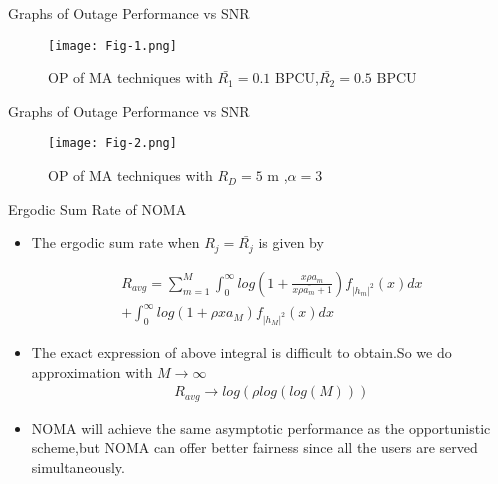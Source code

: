 \documentclass{beamer}
\providecommand{\brak}[1]{\ensuremath{\left(#1\right)}}
\providecommand{\abs}[1]{\vert#1\vert}
\begin{document}
        \begin{frame}{Graphs of Outage Performance vs SNR}
       
            \begin{figure}[ht]
    \centering
    \texttt{[image: Fig-1.png]}
    \caption{OP of MA techniques with $\bar{R_1}=0.1$ BPCU,$\bar{R_2}=0.5$ BPCU}
    \label{OP vs SNR 1}
\end{figure}
        \end{frame}
               \begin{frame}{Graphs of Outage Performance vs SNR}
       
            \begin{figure}[ht]
    \centering
    \texttt{[image: Fig-2.png]}
    \caption{OP of MA techniques with $R_D=5$ m ,$\alpha=3$ }
    \label{OP vs SNR 2}
\end{figure}
        \end{frame}
        \begin{frame}{}
            \begin{block}{Ergodic Sum Rate of NOMA}
            \begin{itemize}
                \item The ergodic sum rate when $R_j=\bar{R_j}$ is given by
                
                    \begin{equation}
                   \begin{split} R_{avg}=\sum_{m=1}^{M} \int_{0} ^{\infty} log\brak{1+\frac{x \rho a_m}{x\rho \bar{a_m}+1}} f_{\abs{h_m}^2} (x) dx\\
                    +\int_{0} ^{\infty} log(1+\rho x a_M) f_{\abs{h_M}^2} (x) dx
                    \end{split}
                    \end{equation}
        \item The exact expression of above integral is difficult to obtain.So we do approximation with $M \rightarrow \infty$
        \begin{align}
            R_{avg} \rightarrow log(\rho log(log(  M)))
        \end{align}
        \item NOMA will achieve the same asymptotic performance as the opportunistic scheme,but NOMA can offer better fairness since all the users are served simultaneously.
            \end{itemize}
            \end{block}
        \end{frame}
\end{document}
